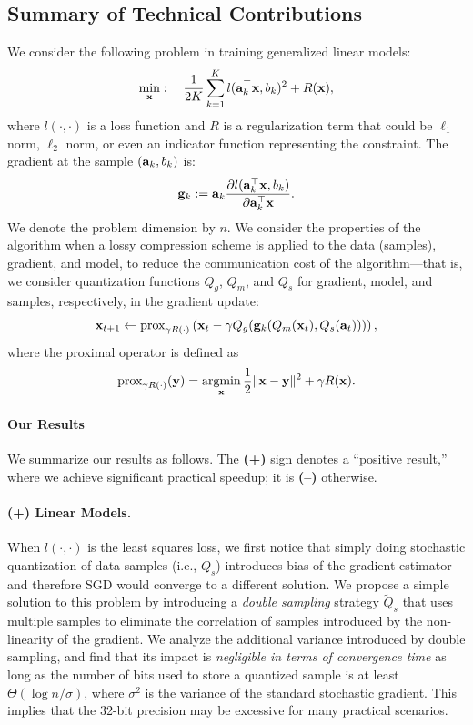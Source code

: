 \documentclass{article}
\renewcommand{\vec}[1]{\mathbf{#1}}
\def\a{{\bf a}}
\def\g{{\bf g}}
\def\x{{\bf x}}
\def\y{{\bf y}}
\DeclareMathOperator*{\argmin}{argmin}
\begin{document}
\subsection{Summary of Technical Contributions}

We consider the following problem in training generalized linear models: 
\begin{align}
\min_{\x}:\quad {1\over 2K}\sum_{k=1}^K l(\a_k^\top \x, b_k)^2 + R(\x),
\label{eqn:leastsquares}
\end{align}
where $l(\cdot,\cdot)$ is a loss function and $R$ is a regularization term that could be $\ell_1$ norm, $\ell_2$ norm, or even an indicator function representing the constraint. 
The gradient at the sample $(\a_k, b_k)$ is: 
\[
\g_k := \a_k \frac{\partial l(\a_k^\top \x, b_k)}{\partial \a_k^\top \x} .
\]
We denote the problem dimension by $n$. 
We consider the properties of the algorithm when a lossy compression scheme is applied to the data (samples), 
gradient, and model, to reduce the communication cost of the algorithm---that is, we consider quantization functions $Q_g$, $Q_m$, and $Q_s$ for gradient, model, and samples, respectively, in the gradient update:
\begin{align}
\x_{t + 1} \leftarrow \text{prox}_{\gamma R(\cdot)}\left(\x_t - \gamma Q_g(\g_k (Q_m(\x_t), Q_s(\vec{a}_t)))\right),
\label{eq:proxupdate}
\end{align}
where the proximal operator is defined as
\[
\text{prox}_{\gamma R(\cdot)}(\y) =\argmin_{\x} {1\over 2}\|\x-\y\|^2 + \gamma R(\x).
\]

\paragraph{Our Results} We summarize our results as follows. The {\bf (+)}
sign denotes a ``positive result,'' where we achieve
significant practical speedup; it is {\bf (--)} otherwise.

\paragraph{(+) Linear Models.} When $l(\cdot,\cdot)$ is 
the least squares loss, we first notice that
simply doing stochastic quantization of data samples  
(i.e., $Q_s$) introduces bias of the gradient
estimator and therefore SGD would converge
to a different solution. We propose a simple
solution to this problem by introducing a
{\em double sampling} strategy
$\tilde{Q}_s$ that uses multiple samples to
eliminate the correlation of samples introduced
by the non-linearity of the gradient. We
analyze the additional variance introduced
by double sampling, and find that its impact is \emph{negligible in terms of convergence time} as long as the 
number of bits used to store a quantized sample is at least $\Theta( \log n / \sigma )$, 
where $\sigma^2$ is the variance of the standard stochastic gradient. 
This implies that the 32-bit precision may be excessive for many practical scenarios. 
\end{document}
